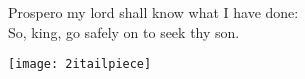 
\begin{verse_speech}[Ariel] 
Prospero my lord shall know what I have done:\\
So, king, go safely on to seek thy son.
\end{verse_speech}

\exeunt{}
\vfill
\begin{center}
\texttt{[image: 2itailpiece]}
\end{center}

